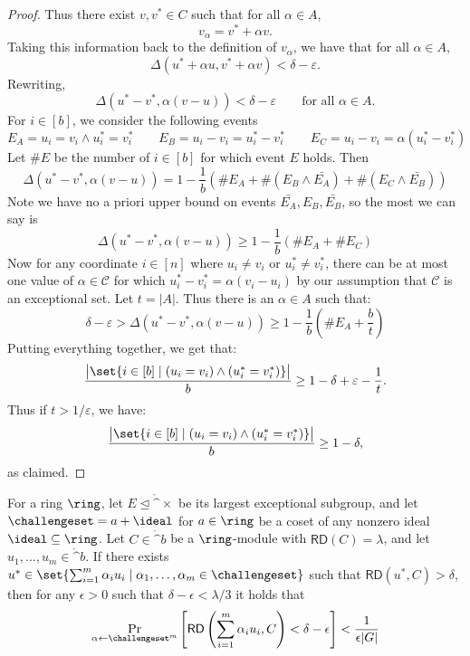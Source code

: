 \begin{proof}
Thus there exist $v, v^\ast \in C$ such that for all $\alpha \in A$,
\[
v_\alpha = v^\ast + \alpha v.
\]
Taking this information back to the definition of $v_\alpha$, we have that for all $\alpha \in A$,
\[
\Delta(u^\ast + \alpha u, v^\ast + \alpha v) < \delta - \varepsilon.
\]
Rewriting,
\[
\Delta(u^\ast - v^\ast, \alpha (v - u)) < \delta - \varepsilon
\qquad\text{for all }\alpha \in A.
\]
For $i \in [b]$, we consider the following events
\[
E_A = u_i = v_i \wedge u^{\ast}_i = v^{\ast}_i \qquad
E_B = u_i - v_i = u^{\ast}_i - v^{\ast}_i \qquad
E_C = u_i - v_i = \alpha(u^{\ast}_i - v^{\ast}_i)
\]
Let $\#E$ be the number of $i \in [b]$ for which event $E$ holds. Then
\[
\Delta(u^\ast - v^\ast, \alpha (v - u)) = 1 - \frac{1}{b}(\#E_A + \#(E_B \wedge \bar{E_A}) + \#(E_C \wedge \bar{E_B}))
\]
Note we have no a priori upper bound on events $\bar{E_A}, E_B, \bar{E_B}$, so the most we can say is
\[
\Delta(u^\ast - v^\ast, \alpha (v - u)) \geq 1 - \frac{1}{b}(\#E_A + \#E_C)
\]
Now for any coordinate $i \in [n]$ where $u_i \neq v_i$ or $u^\ast_i \neq v^\ast_i$, there can be at most one 
value of $\alpha \in \mathcal{C}$ for which $u^\ast_i - v^\ast_i = \alpha (v_i - u_i)$ by our assumption that $\mathcal{C}$ is an exceptional set. Let $t = |A|$. Thus there is an $\alpha \in A$ such that:
\[
\delta - \varepsilon > \Delta(u^\ast - v^\ast, \alpha (v - u))
\geq 1 - \frac{1}{b}(\#E_A + \frac{b}{t})
\]
Putting everything together, we get that:
\[
\frac{\big|\set{i \in [b] \mid (u_i = v_i) \wedge (u^\ast_i = v^\ast_i)}\big|}{b}
\geq 1 - \delta + \varepsilon - \frac{1}{t}.
\]
Thus if $t > 1/\varepsilon$, we have:
\[
\frac{\big|\set{ i \in [b] \mid (u_i = v_i) \wedge (u^\ast_i = v^\ast_i)}\big|}{b}
\geq 1 - \delta,
\]
as claimed.
\end{proof}

\begin{theorem}
\label{thm:proximity gap}
For a ring $\ring$, let $E \trianglelefteq \ring^\times$ be its largest exceptional subgroup, and let $\challengeset=a+\ideal$ for $a \in \ring$ be a coset of any nonzero ideal $\ideal \subseteq \ring$. Let $C \in \ring^b$ be a $\ring$-module with $\mathsf{RD}(C) = \lambda$, and let $u_1,\dotsc,u_m \in \ring^b$. If there exists $u^\ast \in \set{\sum_{i=1}^{m} \alpha_i u_i \mid \alpha_1,\dotsc,\alpha_m \in \challengeset}$ such that $\mathsf{RD}(u^\ast, C) > \delta$, then for any $\epsilon > 0$ such that $\delta-\epsilon < \lambda/3$ it holds that
\[
\Pr_{\alpha \gets \challengeset^m} \left[\mathsf{RD}\left(\sum_{i=1}^{m} \alpha_i u_i,C\right) < \delta - \epsilon\right] < \frac{1}{\epsilon |G|}
\]
\end{theorem}

